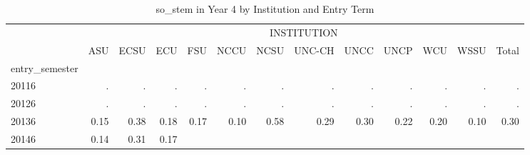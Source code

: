 \begin{table}[!h]
\caption{so\_stem in Year 4 by Institution and Entry Term}
\centering
\begin{tabular}{lllllllllllll}
\cline{1-13}
\multicolumn{1}{c}{} &
  \multicolumn{12}{|c}{INSTITUTION} \\
\multicolumn{1}{c}{} &
  \multicolumn{1}{|r}{ASU} &
  \multicolumn{1}{r}{ECSU} &
  \multicolumn{1}{r}{ECU} &
  \multicolumn{1}{r}{FSU} &
  \multicolumn{1}{r}{NCCU} &
  \multicolumn{1}{r}{NCSU} &
  \multicolumn{1}{r}{UNC-CH} &
  \multicolumn{1}{r}{UNCC} &
  \multicolumn{1}{r}{UNCP} &
  \multicolumn{1}{r}{WCU} &
  \multicolumn{1}{r}{WSSU} &
  \multicolumn{1}{r}{Total} \\
\cline{1-13}
\multicolumn{1}{l}{entry\_semester} &
  \multicolumn{1}{|r}{} &
  \multicolumn{1}{r}{} &
  \multicolumn{1}{r}{} &
  \multicolumn{1}{r}{} &
  \multicolumn{1}{r}{} &
  \multicolumn{1}{r}{} &
  \multicolumn{1}{r}{} &
  \multicolumn{1}{r}{} &
  \multicolumn{1}{r}{} &
  \multicolumn{1}{r}{} &
  \multicolumn{1}{r}{} &
  \multicolumn{1}{r}{} \\
\multicolumn{1}{l}{\hspace{1em}20116} &
  \multicolumn{1}{|r}{.} &
  \multicolumn{1}{r}{.} &
  \multicolumn{1}{r}{.} &
  \multicolumn{1}{r}{.} &
  \multicolumn{1}{r}{.} &
  \multicolumn{1}{r}{.} &
  \multicolumn{1}{r}{.} &
  \multicolumn{1}{r}{.} &
  \multicolumn{1}{r}{.} &
  \multicolumn{1}{r}{.} &
  \multicolumn{1}{r}{.} &
  \multicolumn{1}{r}{.} \\
\multicolumn{1}{l}{\hspace{1em}20126} &
  \multicolumn{1}{|r}{.} &
  \multicolumn{1}{r}{.} &
  \multicolumn{1}{r}{.} &
  \multicolumn{1}{r}{.} &
  \multicolumn{1}{r}{.} &
  \multicolumn{1}{r}{.} &
  \multicolumn{1}{r}{.} &
  \multicolumn{1}{r}{.} &
  \multicolumn{1}{r}{.} &
  \multicolumn{1}{r}{.} &
  \multicolumn{1}{r}{.} &
  \multicolumn{1}{r}{.} \\
\multicolumn{1}{l}{\hspace{1em}20136} &
  \multicolumn{1}{|r}{0.15} &
  \multicolumn{1}{r}{0.38} &
  \multicolumn{1}{r}{0.18} &
  \multicolumn{1}{r}{0.17} &
  \multicolumn{1}{r}{0.10} &
  \multicolumn{1}{r}{0.58} &
  \multicolumn{1}{r}{0.29} &
  \multicolumn{1}{r}{0.30} &
  \multicolumn{1}{r}{0.22} &
  \multicolumn{1}{r}{0.20} &
  \multicolumn{1}{r}{0.10} &
  \multicolumn{1}{r}{0.30} \\
\multicolumn{1}{l}{\hspace{1em}20146} &
  \multicolumn{1}{|r}{0.14} &
  \multicolumn{1}{r}{0.31} &
  \multicolumn{1}{r}{0.17} &

\end{tabular}
\end{table}
